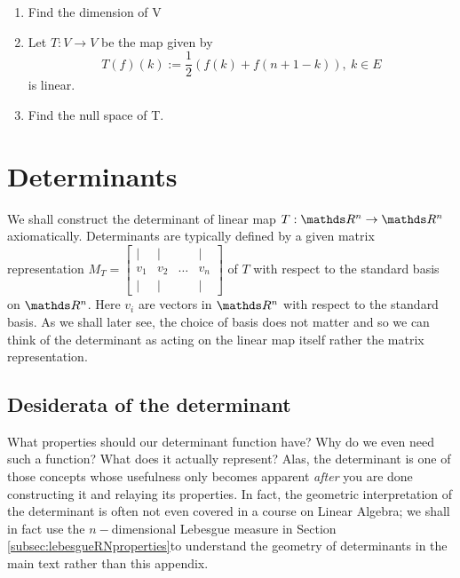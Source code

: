 \begin{enumerate}
\item Find the dimension of V
\item Let $T:V\to V$ be the map given by 
\[
T\left(f\right)\left(k\right):=\frac{1}{2}\left(f\left(k\right)+f\left(n+1-k\right)\right),\ k\in E
\]
is linear.
\item Find the null space of T.
\end{enumerate}

\section{Determinants\label{sec:Determinants}}

We shall construct the determinant of linear map $T:\R^{n}\to\R^{n}$axiomatically.
Determinants are typically defined by a given matrix representation
$M_{T}=\left[\begin{array}{cccc}
| & | &  & |\\
v_{1} & v_{2} & \ldots & v_{n}\\
| & | &  & |
\end{array}\right]$ of $T$ with respect to the standard basis on $\R^{n}$. Here $v_{i}$
are vectors in $\R^{n}$ with respect to the standard basis. As we
shall later see, the choice of basis does not matter and so we can
think of the determinant as acting on the linear map itself rather
the matrix representation.

\subsection{Desiderata of the determinant}

What properties should our determinant function have? Why do we even
need such a function? What does it actually represent? Alas, the determinant
is one of those concepts whose usefulness only becomes apparent \emph{after
}you are done constructing it and relaying its properties. In fact,
the geometric interpretation of the determinant is often not even
covered in a course on Linear Algebra; we shall in fact use the $n-$dimensional
Lebesgue measure in Section \ref{subsec:lebesgueRNproperties}to understand
the geometry of determinants in the main text rather than this appendix.

